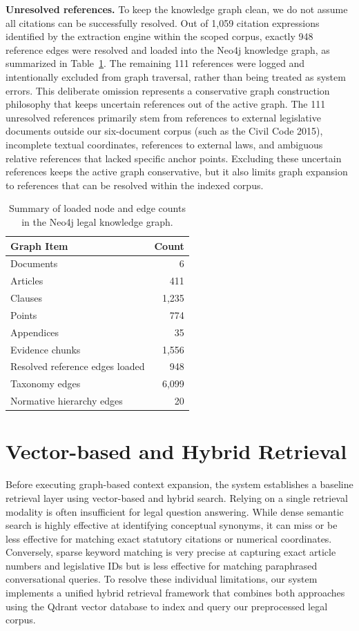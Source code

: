\textbf{Unresolved references.} To keep the knowledge graph clean, we do not assume all citations can be successfully resolved. Out of 1,059 citation expressions identified by the extraction engine within the scoped corpus, exactly 948 reference edges were resolved and loaded into the Neo4j knowledge graph, as summarized in Table~\ref{tab:graph-node-edge-counts}. The remaining 111 references were logged and intentionally excluded from graph traversal, rather than being treated as system errors. This deliberate omission represents a conservative graph construction philosophy that keeps uncertain references out of the active graph. The 111 unresolved references primarily stem from references to external legislative documents outside our six-document corpus (such as the Civil Code 2015), incomplete textual coordinates, references to external laws, and ambiguous relative references that lacked specific anchor points. Excluding these uncertain references keeps the active graph conservative, but it also limits graph expansion to references that can be resolved within the indexed corpus.

\begin{table}[H]
  \centering
  \caption{Summary of loaded node and edge counts in the Neo4j legal knowledge graph.}
  \label{tab:graph-node-edge-counts}
  \begin{tabular}{lr}
    \toprule
    Graph Item & Count \\
    \midrule
    Documents & 6 \\
    Articles & 411 \\
    Clauses & 1,235 \\
    Points & 774 \\
    Appendices & 35 \\
    Evidence chunks & 1,556 \\
    Resolved reference edges loaded & 948 \\
    Taxonomy edges & 6,099 \\
    Normative hierarchy edges & 20 \\
    \bottomrule
  \end{tabular}
\end{table}
\FloatBarrier

\section{Vector-based and Hybrid Retrieval}

Before executing graph-based context expansion, the system establishes a baseline retrieval layer using vector-based and hybrid search. Relying on a single retrieval modality is often insufficient for legal question answering. While dense semantic search is highly effective at identifying conceptual synonyms, it can miss or be less effective for matching exact statutory citations or numerical coordinates. Conversely, sparse keyword matching is very precise at capturing exact article numbers and legislative IDs but is less effective for matching paraphrased conversational queries. To resolve these individual limitations, our system implements a unified hybrid retrieval framework that combines both approaches using the Qdrant vector database \cite{qdrant_docs} to index and query our preprocessed legal corpus.


